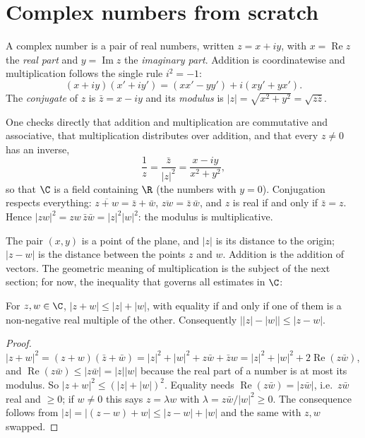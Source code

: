 
\section{Complex numbers from scratch}

\begin{definitionx}
A complex number is a pair of real numbers, written $z=x+iy$, with $x=\operatorname{Re}z$ the \emph{real part} and $y=\operatorname{Im}z$ the
\emph{imaginary part}. Addition is coordinatewise and multiplication follows the single rule $i^2=-1$:
\[
(x+iy)(x'+iy')=(xx'-yy')+i(xy'+yx').
\]
The \emph{conjugate} of $z$ is $\bar z=x-iy$ and its \emph{modulus} is $|z|=\sqrt{x^2+y^2}=\sqrt{z\bar z}$.
\end{definitionx}

One checks directly that addition and multiplication are commutative and associative, that multiplication distributes over addition, and that
every $z\ne0$ has an inverse,
\[
\frac1z=\frac{\bar z}{|z|^2}=\frac{x-iy}{x^2+y^2},
\]
so that $\C$ is a field containing $\R$ (the numbers with $y=0$). Conjugation respects everything: $\overline{z+w}=\bar z+\bar w$,
$\overline{zw}=\bar z\,\bar w$, and $z$ is real if and only if $\bar z=z$. Hence $|zw|^2=zw\,\bar z\bar w=|z|^2|w|^2$: the modulus is multiplicative.

The pair $(x,y)$ is a point of the plane, and $|z|$ is its distance to the origin; $|z-w|$ is the distance between the points $z$ and $w$.
Addition is the addition of vectors. The geometric meaning of multiplication is the subject of the next section; for now, the inequality that
governs all estimates in $\C$:

\begin{propositionx}
For $z,w\in\C$, $|z+w|\le|z|+|w|$, with equality if and only if one of them is a non-negative real multiple of the other. Consequently
$\bigl||z|-|w|\bigr|\le|z-w|$.
\end{propositionx}
\begin{proof}
$|z+w|^2=(z+w)(\bar z+\bar w)=|z|^2+|w|^2+z\bar w+\bar zw=|z|^2+|w|^2+2\operatorname{Re}(z\bar w)$, and $\operatorname{Re}(z\bar w)\le|z\bar w|=|z||w|$
because the real part of a number is at most its modulus. So $|z+w|^2\le(|z|+|w|)^2$. Equality needs $\operatorname{Re}(z\bar w)=|z\bar w|$, i.e.\ $z\bar w$
real and $\ge0$; if $w\ne0$ this says $z=\lambda w$ with $\lambda=z\bar w/|w|^2\ge0$. The consequence follows from $|z|=|(z-w)+w|\le|z-w|+|w|$ and the same with $z,w$ swapped.
\end{proof}

